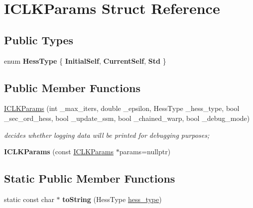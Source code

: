 \hypertarget{structICLKParams}{\section{I\-C\-L\-K\-Params Struct Reference}
\label{structICLKParams}
}
\subsection*{Public Types}
\begin{DoxyCompactItemize}
\item 
enum {\bfseries Hess\-Type} \{ {\bfseries Initial\-Self}, 
{\bfseries Current\-Self}, 
{\bfseries Std}
 \}
\end{DoxyCompactItemize}
\subsection*{Public Member Functions}
\begin{DoxyCompactItemize}
\item 
\hyperlink{structICLKParams_a2af0cd6dfd77ac0fb5ecf4e50485a970}{I\-C\-L\-K\-Params} (int \-\_\-max\-\_\-iters, double \-\_\-epsilon, Hess\-Type \-\_\-hess\-\_\-type, bool \-\_\-sec\-\_\-ord\-\_\-hess, bool \-\_\-update\-\_\-ssm, bool \-\_\-chained\-\_\-warp, bool \-\_\-debug\-\_\-mode)
\begin{DoxyCompactList}\small\item\em decides whether logging data will be printed for debugging purposes; \end{DoxyCompactList}\item 
\hypertarget{structICLKParams_a9a13691f0aaf8d10e4700e77ddeb6270}{{\bfseries I\-C\-L\-K\-Params} (const \hyperlink{structICLKParams}{I\-C\-L\-K\-Params} $\ast$params=nullptr)}\label{structICLKParams_a9a13691f0aaf8d10e4700e77ddeb6270}

\end{DoxyCompactItemize}
\subsection*{Static Public Member Functions}
\begin{DoxyCompactItemize}
\item 
\hypertarget{structICLKParams_af84dd9fd7cbcdf2219943d35a80b4005}{static const char $\ast$ {\bfseries to\-String} (Hess\-Type \hyperlink{structICLKParams_a07bb2297e80debb470a3696e1e1877c6}{hess\-\_\-type})}\label{structICLKParams_af84dd9fd7cbcdf2219943d35a80b4005}

\end{DoxyCompactItemize}
